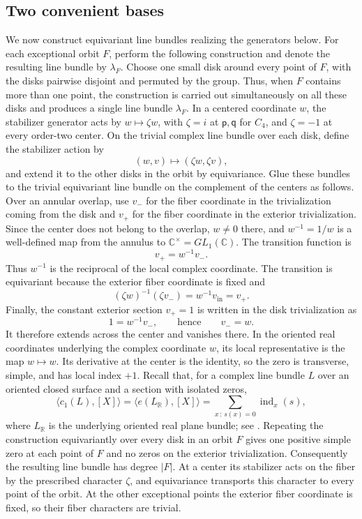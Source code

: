 \documentclass[11pt]{amsart}
\newcommand{\R}{\mathbb R}
\newcommand{\C}{\mathbb C}
\theoremstyle{remark}
\numberwithin{equation}{section}
\begin{document}
\subsection{Two convenient bases}

We now construct equivariant line bundles realizing the generators below. For each exceptional orbit $F$, perform the following construction and denote the resulting line bundle by $\lambda_F$. Choose one small disk around every point of $F$, with the disks pairwise disjoint and permuted by the group. Thus, when $F$ contains more than one point, the construction is carried out simultaneously on all these disks and produces a single line bundle $\lambda_F$. In a centered coordinate $w$, the stabilizer generator acts by $w\mapsto\zeta w$, with $\zeta=i$ at $\mathsf p,\mathsf q$ for $C_4$, and $\zeta=-1$ at every order-two center. On the trivial complex line bundle over each disk, define the stabilizer action by
\[
 (w,v)\longmapsto(\zeta w,\zeta v),
\]
and extend it to the other disks in the orbit by equivariance. Glue these bundles to the trivial equivariant line bundle on the complement of the centers as follows. Over an annular overlap, use $v_{-}$ for the fiber coordinate in the trivialization coming from the disk and $v_{+}$ for the fiber coordinate in the exterior trivialization. Since the center does not belong to the overlap, $w\ne0$ there, and $w^{-1}=1/w$ is a well-defined map from the annulus to $\C^\times=GL_1(\C)$. The transition function is
\begin{equation*}
 v_{+}=w^{-1}v_{-}.
\end{equation*}
Thus $w^{-1}$ is the reciprocal of the local complex coordinate. The transition is equivariant because the exterior fiber coordinate is fixed and
\[
 (\zeta w)^{-1}(\zeta v_{-})
 =w^{-1}v_{\mathrm{in}}=v_{+}.
\]
Finally, the constant exterior section $v_{+}=1$ is written in the disk trivialization as
\[
 1=w^{-1}v_{-},\qquad\text{hence}\qquad
 v_{-}=w.
\]
It therefore extends across the center and vanishes there. In the
oriented real coordinates underlying the complex coordinate $w$, its
local representative is the map $w\mapsto w$. Its derivative at the
center is the identity, so the zero is transverse, simple, and has local
index $+1$. Recall that, for a complex line bundle $L$ over an oriented
closed surface and a section with isolated zeros,
\[
 \langle c_1(L),[X]\rangle
 =\langle e(L_{\R}),[X]\rangle
 =\sum_{x\,:\,s(x)=0}\operatorname{ind}_x(s),
\]
where $L_{\R}$ is the underlying oriented real plane bundle; see
\cite[Theorem~11.17]{BT}. Repeating the construction equivariantly over
every disk in an orbit $F$ gives one positive simple zero at each point
of $F$ and no zeros on the exterior trivialization. Consequently the
resulting line bundle has degree $|F|$. At a center its stabilizer acts
on the fiber by the prescribed character $\zeta$, and equivariance
transports this character to every point of the orbit. At the other
exceptional points the exterior fiber coordinate is fixed, so their
fiber characters are trivial.
\end{document}
